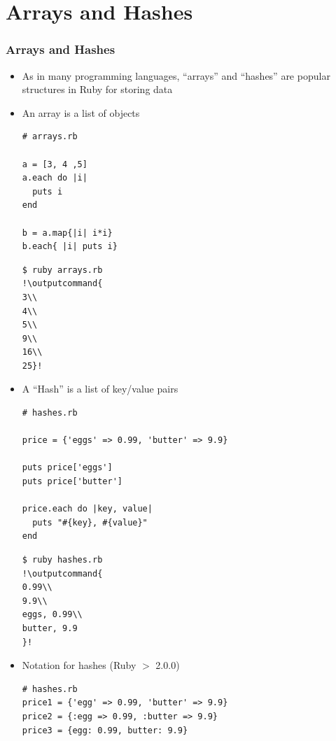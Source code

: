 \documentclass{beamer}
\newcommand{\outputcommand}[1]{\color{darkgreen}{#1}}
\begin{document}
\section{Arrays and Hashes}
\begin{frame}
\frametitle{Arrays and Hashes}
\begin{itemize}
 \item As in many programming languages, ``arrays'' and ``hashes'' are popular structures in Ruby for storing data
 \item An array is a list of objects 
\lstset{language=Ruby, style=eclipse}
\begin{lstlisting}[escapechar=&]
# arrays.rb

a = [3, 4 ,5]
a.each do |i|
  puts i
end

b = a.map{|i| i*i}
b.each{ |i| puts i}
\end{lstlisting}

\lstset{language=shell}
\begin{lstlisting}[numbers=none, escapechar=!]
$ ruby arrays.rb
!\outputcommand{
3\\
4\\
5\\
9\\
16\\
25}!
\end{lstlisting}
 \item A ``Hash'' is a list of key/value pairs
\lstset{language=Ruby, style=eclipse}
\begin{lstlisting}[escapechar=&]
# hashes.rb

price = {'eggs' => 0.99, 'butter' => 9.9}

puts price['eggs']
puts price['butter']

price.each do |key, value|
  puts "#{key}, #{value}"
end
\end{lstlisting}

\lstset{language=shell}
\begin{lstlisting}[numbers=none, escapechar=!]
$ ruby hashes.rb
!\outputcommand{
0.99\\
9.9\\
eggs, 0.99\\
butter, 9.9
}!
\end{lstlisting}

\item Notation for hashes (Ruby $>$ 2.0.0)
\lstset{language=Ruby, style=eclipse}
\begin{lstlisting}[escapechar=&]
# hashes.rb
price1 = {'egg' => 0.99, 'butter' => 9.9}
price2 = {:egg => 0.99, :butter => 9.9}
price3 = {egg: 0.99, butter: 9.9}


\end{lstlisting}
\end{itemize}
\end{frame}
\end{document}
